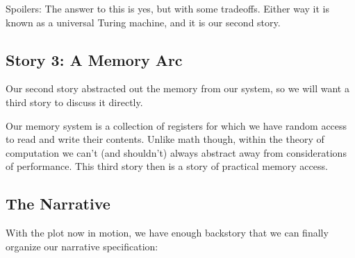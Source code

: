 \documentclass[twoside]{article}
\begin{document}
Spoilers: The answer to this is yes, but with some tradeoffs. Either way it is known as a universal Turing machine,
and it is our second story.

\subsection*{Story 3: A Memory Arc}

Our second story abstracted out the memory from our system, so we will want a third story to discuss it directly.

Our memory system is a collection of registers for which we have random access to read and write their contents.
Unlike math though, within the theory of computation we can't (and shouldn't) always abstract away from considerations
of performance. This third story then is a story of practical memory access.

\subsection*{The Narrative}

With the plot now in motion, we have enough backstory that we can finally organize our narrative specification:
\end{document}
